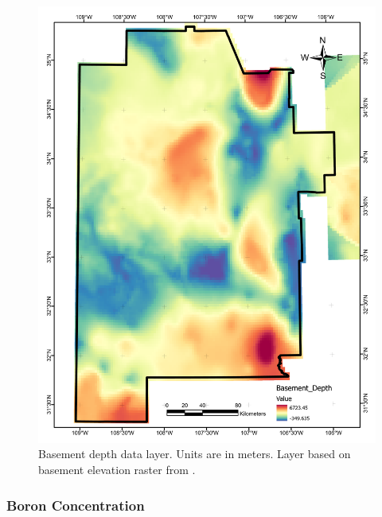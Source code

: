 \begin{figure}[!htp]
\centering
\includegraphics[scale=.50]{templates/images/Figure-BasementDepth.pdf}
\caption[Basement depth data layer]{Basement depth data layer. Units are in meters. Layer based on basement elevation raster from \protect\citep{bielicki_hydrogeolgic_2015}.}
\label{fig:feat_basementdepth}
\end{figure}

\subsubsection{Boron Concentration}

